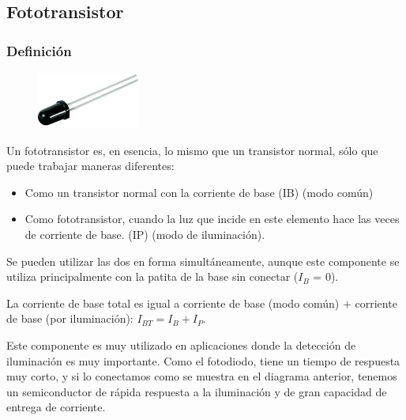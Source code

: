 \documentclass[12pt, fleqn]{article}                            %
\theoremstyle{break}                                            %
\begin{document}
    \clearpage
    \subsection{Fototransistor}

        \subsubsection{Definición}

            \begin{figure}
                \centering
                \includegraphics[width=0.30\textwidth]{Fototransistor}
            \end{figure}

            Un fototransistor es, en esencia, lo mismo que un transistor normal,
            sólo que puede trabajar maneras diferentes:

            \begin{itemize}
                \item Como un transistor normal con la corriente de base (IB) (modo común)
                \item Como fototransistor, cuando la luz que incide en este elemento hace
                    las veces de corriente de base. (IP) (modo de iluminación). 
            \end{itemize}

            Se pueden utilizar las dos en forma simultáneamente, aunque este componente
            se utiliza principalmente con la patita de la base sin conectar ($I_B$ = 0).

            La corriente de base total es igual a corriente de base (modo común) + corriente
            de base (por iluminación): $I_{BT} = I_B + I_P$.

            Este componente es muy utilizado en aplicaciones donde la detección de iluminación
            es muy importante. Como el fotodiodo, tiene un tiempo de respuesta muy corto, y si
            lo conectamos como se muestra en el diagrama anterior, tenemos un semiconductor de
            rápida respuesta a la iluminación y de gran capacidad de entrega de corriente.
\end{document}
